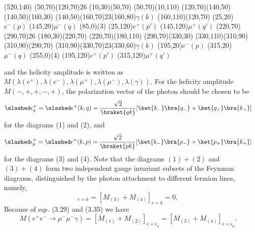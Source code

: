 \begin{axopicture}(520,140)
	\Photon(50,70)(120,70){2}{6}
	\Line[arrow](10,30)(50,70)
	\Line[arrow](50,70)(10,110)
	\Line[arrow](120,70)(140,50)\Line[arrow](140,50)(160,30)
	\Photon(140,50)(160,70){2}{3}\Text(160,80){$\gamma(k)$}
	\Line[arrow](160,110)(120,70)
	\Text(25,20){$e^-(p)$}
	\Text(145,20){$\mu^-(q)$}
	\Text(85,0){(3)}
	\Text(25,120){$e^+(p')$}
	\Text(145,120){$\mu^+(q')$}
	\Photon(220,70)(290,70){2}{6}
	\Line[arrow](180,30)(220,70)
	\Line[arrow](220,70)(180,110)
	\Line[arrow](290,70)(330,30)
	\Line[arrow](330,110)(310,90)\Line[arrow](310,90)(290,70)
	\Photon(310,90)(330,70){2}{3}\Text(330,60){$\gamma(k)$}
	\Text(195,20){$e^-(p)$}
	\Text(315,20){$\mu^-(q)$}
	\Text(255,0){(4)}
	\Text(195,120){$e^+(p')$}
	\Text(315,120){$\mu^+(q')$}
\end{axopicture}
and the helicity amplitude is written as $M(\lambda(e^+),\lambda(e^-),\lambda(\mu^+),\lambda(\mu^-),\lambda(\gamma))$. For the helicity amplitude $M(-,+,+,-,+)$, the polarization vector of the photon should be chosen to be
\begin{equation}
\slashed \epsilon^+_q=\slashed \epsilon^+(k,q)=\frac{\sqrt{2}}{\braket{qk}}[\ket{k_-}\bra{q_-}+\ket{q_+}\bra{k_+}]
\end{equation}
for the diagrams (1) and (2), and 
\begin{equation}
\slashed \epsilon^+_p=\slashed \epsilon^+(k,p)=\frac{\sqrt{2}}{\braket{pk}}[\ket{k_-}\bra{p_-}+\ket{p_+}\bra{k_+}]
\end{equation}
for the diagrams (3) and (4). Note that \cite{calkul4,ZZL} the diagrams $(1)+(2)$ and $(3)+(4)$ form two independent gauge invariant subsets of the Feynman diagrams, distinguished by the photon attachment to different fermion lines, namely,
\begin{equation}
[M_{(1)}+M_{(2)}]_{\epsilon=k}=[M_{(3)}+M_{(4)}]_{\epsilon=k}=0,
\end{equation}
Because of eqs. (3.29) and (3.35) we have
\begin{equation}
M(e^+e^-\to\mu^-\mu^-\gamma)=[M_{(1)}+M_{(2)}]_{\epsilon=\epsilon_q}=[M_{(3)}+M_{(4)}]_{\epsilon=\epsilon_p}.
\end{equation}

